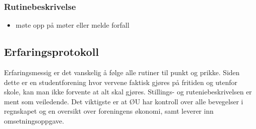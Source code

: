 \subsubsection{Rutinebeskrivelse}
\begin{itemize}
\item{} møte opp på møter eller melde forfall
\end{itemize}

\subsection{Erfaringsprotokoll}
Erfaringsmessig er det vanskelig å følge alle rutiner til punkt og
prikke. Siden dette er en studentforening hvor vervene faktisk gjøres
på fritiden og utenfor skole, kan man ikke forvente at alt skal
gjøres. Stillings- og ruteniebeskrivelsen er ment som veiledende. Det
viktigste er at ØU har kontroll over alle bevegelser i regnskapet og
en oversikt over foreningens økonomi, samt leverer inn omsetningsoppgave. 
